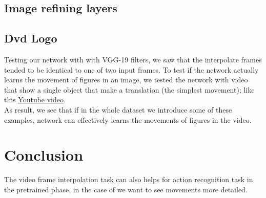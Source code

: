 \documentclass[11pt, a4paper]{article}
\begin{document}
	\subsection{Image refining layers}
	\subsection{Dvd Logo}
	Testing our network with with VGG-19 filters, we saw that the interpolate frames tended to be identical to one of two input frames. To test if the network actually learns the movement of figures in an image, we tested the network with video that show a single object that make a translation (the simplest movement); like this \href{https://www.youtube.com/watch?v=5mGuCdlCcNM}{Youtube video}.\\
	As result, we see that if in the whole dataset we introduce some of these examples, network can effectively learns the movements of figures in the video. 
	
	\section{Conclusion}
	The video frame interpolation task can also helps for action recognition task in the pretrained phase, in the case of we want to see movements more detailed.
	
	
	
	
\end{document}
